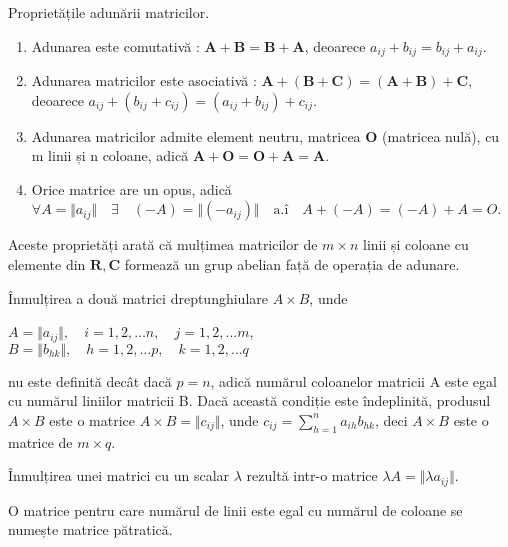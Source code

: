 Proprietățile adunării matricilor.
\begin{enumerate}
  \item Adunarea este comutativă : $\mathbf{A + B = B + A}$, deoarece
  $\mathit{a_{ij} + b_{ij} = b_{ij} + a_{ij}}$.
  \item Adunarea matricilor este asociativă : $\mathbf{A + (B + C) = (A + B) +
  C}$, deoarece $\mathit{a_{ij} + (b_{ij} + c_{ij}) = (a_{ij} + b_{ij}) +
  c_{ij}}$.
  \item Adunarea matricilor admite element neutru, matricea \textbf{O}
  (matricea nulă), cu m linii și n coloane, adică $\mathbf{A + O = O + A = A}$.
  \item Orice matrice are un opus, adică $\forall A = \Vert a_{ij} \Vert \quad
   \exists \quad (-A) = \Vert (-a_{ij}) \Vert \quad \text{a.î} \quad 
   A + (-A) = (-A) + A = O$.
\end{enumerate}
Aceste proprietăți arată că mulțimea matricilor de $m \times n$ linii și
coloane cu elemente din $\mathbf{R, C}$ formează un grup abelian față de
operația de adunare.

Înmulțirea a două matrici dreptunghiulare $A \times B$, unde
\begin{center}
$A = \Vert a_{ij} \Vert, \quad i = 1, 2, \dots n, \quad j = 1, 2, \dots m$, \\
$B = \Vert b_{hk} \Vert, \quad h = 1, 2, \dots p, \quad k = 1, 2, \dots q$
\end{center}
nu este definită decât dacă $p = n$, adică numărul coloanelor matricii A este
egal cu numărul liniilor matricii B. Dacă această condiție este îndeplinită, produsul
$A \times B$ este o matrice $A \times B = \Vert c_{ij} \Vert$, unde $c_{ij} =
\sum_{h = 1}^{n}a_{ih}b_{hk}$, deci $A \times B$ este o matrice de $m \times q$.

Înmulțirea unei matrici cu un scalar $\lambda$ rezultă intr-o matrice $\lambda A
= \Vert \lambda a_{ij} \Vert$.

O matrice pentru care numărul de linii este egal cu numărul de coloane se
numește matrice pătratică.

